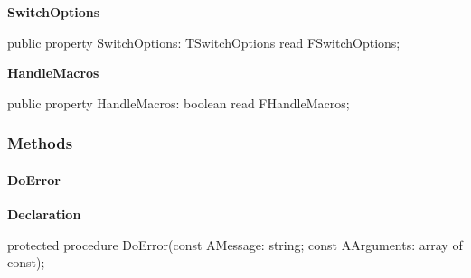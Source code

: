 \documentclass{report}
\newif\ifpdf
\begin{document}
\begin{list}{}
\begin{flushleft}
\ifpdf
\end{flushleft}
\fi


\par  \label{PasDoc_Scanner.TScanner-SwitchOptions}
\item[\textbf{SwitchOptions}\hfill]
\ifpdf
\begin{flushleft}
\fi
\begin{ttfamily}
public property SwitchOptions: TSwitchOptions read FSwitchOptions;\end{ttfamily}

\ifpdf
\end{flushleft}
\fi


\par  \label{PasDoc_Scanner.TScanner-HandleMacros}
\item[\textbf{HandleMacros}\hfill]
\ifpdf
\begin{flushleft}
\fi
\begin{ttfamily}
public property HandleMacros: boolean read FHandleMacros;\end{ttfamily}

\ifpdf
\end{flushleft}
\fi


\par  \end{list}
\subsubsection*{\large{\textbf{Methods}}\normalsize\hspace{1ex}\hfill}
\paragraph*{DoError}\hspace*{\fill}

\label{PasDoc_Scanner.TScanner-DoError}
\begin{list}{}{
\setlength{\itemindent}{0cm}
\setlength{\listparindent}{0cm}
\setlength{\leftmargin}{\evensidemargin}
\addtolength{\leftmargin}{\tmplength}
\settowidth{\labelsep}{X}
\addtolength{\leftmargin}{\labelsep}
\setlength{\labelwidth}{\tmplength}
}
\item[\textbf{Declaration}\hfill]
\ifpdf
\begin{flushleft}
\fi
\begin{ttfamily}
protected procedure DoError(const AMessage: string; const AArguments: array of const);\end{ttfamily}

\ifpdf
\end{flushleft}
\fi

\end{list}
\end{document}
